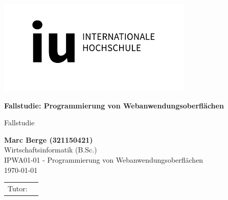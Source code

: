 \def\usesf{}
\let\usesf\sffamily %

\newsavebox{\Tutorin}


\setlength{\unitlength}{1pt}

\begin{titlepage}
\vspace{-39pt}\hspace*{300pt}\includegraphics[width=.21\paperwidth]{logos/IU.png}

\begin{center}
\hbox{}
\vfill
{\usesf}
{\huge\bfseries Fallstudie: Programmierung von Webanwendungsoberflächen \par}
\vskip 1.8cm
Fallstudie\\[2mm]
\vskip 1cm

{\large\bfseries Marc Berge (321150421)\\}
\vskip 1.2cm
Wirtschaftsinformatik (B.Sc.)\\
IPWA01-01 - Programmierung von Webanwendungsoberflächen\\
\today %
\vskip 3cm
\begin{tabular}{p{3cm}l}
Tutor: & \usebox{\Tutorin} \\
\end{tabular}
\vfill
\end{center}

\end{titlepage}


